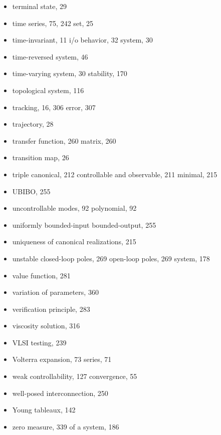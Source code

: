 \begin{itemize}
  \item terminal state, 29
  \item time
    \subitem series, 75, 242
    \subitem set, 25
  \item time-in\-var\-i\-ant, 11
    \subitem i/o behavior, 32
    \subitem system, 30
  \item time-reversed system, 46
  \item time-var\-ying system, 30
    \subitem stability, 170
  \item topological system, 116
  \item tracking, 16, 306
    \subitem error, 307
  \item trajectory, 28
  \item transfer
    \subitem function, 260
    \subitem matrix, 260
  \item transition map, 26
  \item triple
    \subitem canonical, 212
    \subitem controllable and observable, 211
    \subitem minimal, 215

  \indexspace

  \item UBIBO, 255
  \item uncontrollable
    \subitem modes, 92
    \subitem polynomial, 92
  \item uniformly bounded-input bounded-output, 255
  \item uniqueness of canonical realizations, 215
  \item unstable
    \subitem closed-loop poles, 269
    \subitem open-loop poles, 269
    \subitem system, 178

  \indexspace

  \item value function, 281
  \item variation of parameters, 360
  \item verification principle, 283
  \item viscosity solution, 316
  \item VLSI testing, 239
  \item Volterra
    \subitem expansion, 73
    \subitem series, 71

  \indexspace

  \item weak
    \subitem controllability, 127
    \subitem convergence, 55
  \item well-posed interconnection, 250

  \indexspace

  \item Young tableaux, 142

  \indexspace

  \item zero
    \subitem measure, 339
    \subitem of a system, 186

\end{itemize}


